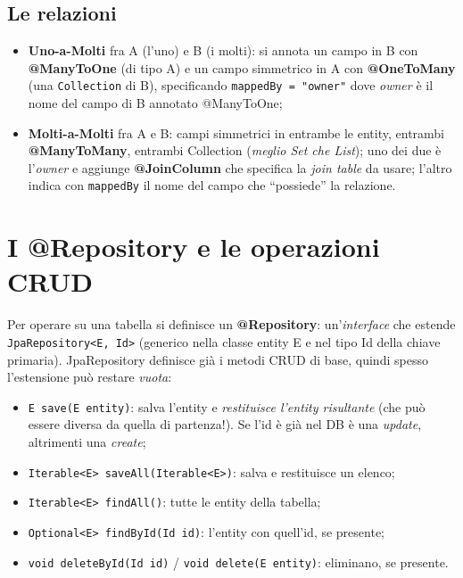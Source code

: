 \subsection{Le relazioni}
\begin{itemize}
  \item \textbf{Uno-a-Molti} fra A (l'uno) e B (i molti): si annota un campo in B con
        \textbf{@ManyToOne} (di tipo A) e un campo simmetrico in A con \textbf{@OneToMany}
        (una \texttt{Collection} di B), specificando \texttt{mappedBy = "owner"} dove
        \emph{owner} \`e il nome del campo di B annotato @ManyToOne;
  \item \textbf{Molti-a-Molti} fra A e B: campi simmetrici in entrambe le entity, entrambi
        \textbf{@ManyToMany}, entrambi Collection (\emph{meglio Set che List}); uno dei due
        \`e l'\emph{owner} e aggiunge \textbf{@JoinColumn} che specifica la \emph{join table}
        da usare; l'altro indica con \texttt{mappedBy} il nome del campo che ``possiede'' la
        relazione.
\end{itemize}

\section{I @Repository e le operazioni CRUD}

\begin{definizione}[Repository]
Per operare su una tabella si definisce un \textbf{@Repository}: un'\emph{interface} che
estende \texttt{JpaRepository<E, Id>} (generico nella classe entity E e nel tipo Id della
chiave primaria). JpaRepository definisce gi\`a i metodi CRUD di base, quindi spesso
l'estensione pu\`o restare \emph{vuota}:
\begin{itemize}
  \item \texttt{E save(E entity)}: salva l'entity e \emph{restituisce l'entity risultante}
        (che pu\`o essere diversa da quella di partenza!). Se l'id \`e gi\`a nel DB \`e una
        \emph{update}, altrimenti una \emph{create};
  \item \texttt{Iterable<E> saveAll(Iterable<E>)}: salva e restituisce un elenco;
  \item \texttt{Iterable<E> findAll()}: tutte le entity della tabella;
  \item \texttt{Optional<E> findById(Id id)}: l'entity con quell'id, se presente;
  \item \texttt{void deleteById(Id id)} / \texttt{void delete(E entity)}: eliminano, se
        presente.
\end{itemize}
\end{definizione}

